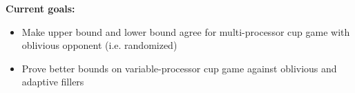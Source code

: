 \documentclass{article}[11pt]
\begin{document}
\textbf{Current goals:}
\begin{itemize}
  \item Make upper bound and lower bound agree for multi-processor cup game
    with oblivious opponent (i.e. randomized)
  \item Prove better bounds on variable-processor cup game against oblivious
    and adaptive fillers
\end{itemize}
\end{document}
